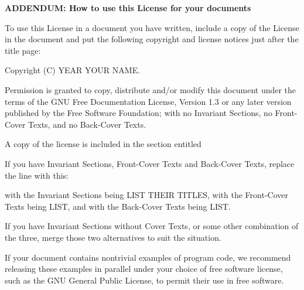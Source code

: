 \textbf{\Large{ADDENDUM: How to use this License for your documents}}

To use this License in a document you have written, include
a copy of the License in the document and put the following
copyright and license notices just after the title page:

\begin{myindentpara}{2cm}
Copyright (C)  YEAR  YOUR NAME.

Permission is granted to copy, distribute and/or modify this document
under the terms of the GNU Free Documentation License, Version 1.3
or any later version published by the Free Software Foundation;
with no Invariant Sections, no Front-Cover Texts, and no Back-Cover
Texts.  

A copy of the license is included in the section entitled 
\end{myindentpara}

If you have Invariant Sections, Front-Cover Texts and
Back-Cover Texts, replace the  line
with this:


\begin{myindentpara}{2cm}
with the Invariant Sections being LIST THEIR TITLES, with
the Front-Cover Texts being LIST, and with the Back-Cover Texts
being LIST.
\end{myindentpara}

If you have Invariant Sections without Cover Texts, or some
other combination of the three, merge those two alternatives
to suit the situation.

If your document contains nontrivial examples of program code,
we recommend releasing these examples in parallel under your
choice of free software license, such as the GNU General
Public License, to permit their use in free software.

